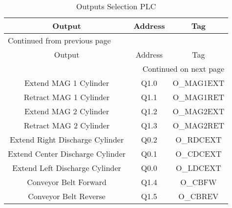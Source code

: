 \begin{longtable}{c|c|c}
\caption{Outputs Selection PLC} \label{tab:plcSelectionOutput}
\\
Output & Address & Tag\\
\hline
\endfirsthead
\multicolumn{3}{l}{Continued from previous page} \\
\hline

Output & Address & Tag \\

\hline
\endhead
\hline\multicolumn{3}{r}{Continued on next page} \\
\endfoot
\endlastfoot
\hline
Extend MAG 1 Cylinder & Q1.0 & O\_MAG1EXT\\
Retract MAG 1 Cylinder & Q1.1 & O\_MAG1RET\\
Extend MAG 2 Cylinder & Q1.2 & O\_MAG2EXT\\
Retract MAG 2 Cylinder & Q1.3 & O\_MAG2RET\\
Extend Right Discharge Cylinder & Q0.2 & O\_RDCEXT\\
Extend Center Discharge Cylinder & Q0.1 & O\_CDCEXT\\
Extend Left Discharge Cylinder & Q0.0 & O\_LDCEXT\\
Conveyor Belt Forward & Q1.4 & O\_CBFW\\
Conveyor Belt Reverse & Q1.5 & O\_CBREV\\
\end{longtable}
